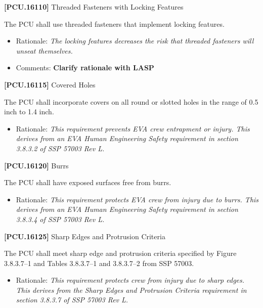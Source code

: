 \textbf{[PCU.16110]} Threaded Fasteners with Locking Features

The \gls{PCU} shall use threaded fasteners that implement locking features.

\begin{itemize}
\item{} Rationale: \emph{The locking features decreases the risk that threaded fasteners will unseat themselves.}

\item{} Comments: \textbf{Clarify rationale with LASP}

\end{itemize}

\textbf{[PCU.16115]} Covered Holes

The \gls{PCU} shall incorporate covers on all round or slotted holes in the range of 0.5 inch to 1.4 inch.

\begin{itemize}
\item{} Rationale: \emph{This requirement prevents EVA crew entrapment or injury. This derives from an EVA Human Engineering Safety requirement in section 3.8.3.2 of SSP 57003 Rev L.}

\end{itemize}

\textbf{[PCU.16120]} Burrs

The \gls{PCU} shall have exposed surfaces free from burrs.

\begin{itemize}
\item{} Rationale: \emph{This requirement protects EVA crew from injury due to burrs. This derives from an EVA Human Engineering Safety requirement in section 3.8.3.4 of SSP 57003 Rev L.}

\end{itemize}

\textbf{[PCU.16125]} Sharp Edges and Protrusion Criteria

The \gls{PCU} shall meet sharp edge and protrusion criteria specified by Figure 3.8.3.7--1 and Tables 3.8.3.7--1 and 3.8.3.7--2 from SSP 57003.

\begin{itemize}
\item{} Rationale: \emph{This requirement protects crew from injury due to sharp edges. This derives from the Sharp Edges and Protrusion Criteria requirement in section 3.8.3.7 of SSP 57003 Rev L.}

\end{itemize}

